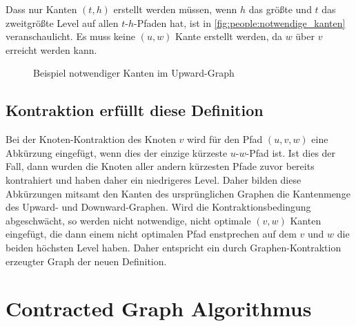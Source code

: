 Dass nur Kanten $(t, h)$ erstellt werden müssen, wenn $h$ das größte und $t$ das zweitgrößte Level auf allen $t$-$h$-Pfaden hat, ist in \autoref{fig:people:notwendige_kanten} veranschaulicht.
Es muss keine $(u, w)$ Kante erstellt werden, da $w$ über $v$ erreicht werden kann.

\begin{figure}[h!]
  \centering
  \caption{Beispiel notwendiger Kanten im Upward-Graph}
  \label{fig:people:notwendige_kanten}
\end{figure}

\subsection{Kontraktion erfüllt diese Definition}

Bei der Knoten-Kontraktion des Knoten $v$ wird für den Pfad $(u, v, w)$ eine Abkürzung eingefügt, wenn dies der einzige kürzeste $u$-$w$-Pfad ist.
Ist dies der Fall, dann wurden die Knoten aller andern kürzesten Pfade zuvor bereits kontrahiert und haben daher ein niedrigeres Level.
Daher bilden diese Abkürzungen mitsamt den Kanten des ursprünglichen Graphen die Kantenmenge des Upward- und Downward-Graphen.
Wird die Kontraktionsbedingung abgeschwächt, so werden nicht notwendige, nicht optimale $(v, w)$ Kanten eingefügt, die dann einem nicht optimalen Pfad enstprechen auf dem $v$ und $w$ die beiden höchsten Level haben.
Daher entspricht ein durch Graphen-Kontraktion erzeugter Graph der neuen Definition.

\section{Contracted Graph Algorithmus}


